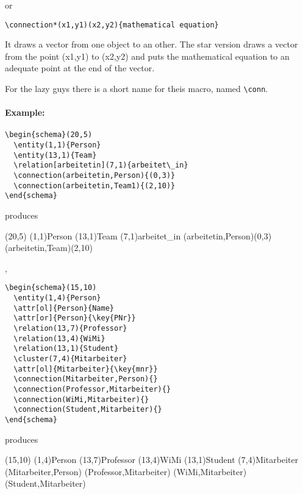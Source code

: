 \documentclass[a4paper,11pt]{article}
\begin{document}
or

\begin{verbatim}
\connection*(x1,y1)(x2,y2){mathematical equation}
\end{verbatim}

It draws a vector from one object to an other. The star version draws 
a vector from the point (x1,y1) to (x2,y2) and puts the mathematical 
equation to an adequate point at the end of the vector.

For the lazy guys there is a short name for theis macro, named \verb|\conn|. 

\paragraph{Example:}

\begin{verbatim}
\begin{schema}(20,5)
  \entity(1,1){Person}
  \entity(13,1){Team}
  \relation[arbeitetin](7,1){arbeitet\_in}
  \connection(arbeitetin,Person){(0,3)}
  \connection(arbeitetin,Team1){(2,10)}
\end{schema}
\end{verbatim}

produces

\begin{schema}(20,5)
  \entity(1,1){Person}
  \entity(13,1){Team}
  \relation[arbeitetin](7,1){arbeitet\_in}
  \connection(arbeitetin,Person){(0,3)}
  \connection(arbeitetin,Team){(2,10)}
\end{schema}

, 

\begin{verbatim}
\begin{schema}(15,10)
  \entity(1,4){Person}
  \attr[ol]{Person}{Name}
  \attr[or]{Person}{\key{PNr}}
  \relation(13,7){Professor}
  \relation(13,4){WiMi}
  \relation(13,1){Student}
  \cluster(7,4){Mitarbeiter}
  \attr[ol]{Mitarbeiter}{\key{mnr}}
  \connection(Mitarbeiter,Person){}
  \connection(Professor,Mitarbeiter){}
  \connection(WiMi,Mitarbeiter){}
  \connection(Student,Mitarbeiter){}
\end{schema}
\end{verbatim}

produces

\begin{schema}(15,10)
  \entity(1,4){Person}
  \relation(13,7){Professor}
  \relation(13,4){WiMi}
  \relation(13,1){Student}
  \cluster(7,4){Mitarbeiter}
  \connection(Mitarbeiter,Person){}
  \connection(Professor,Mitarbeiter){}
  \connection(WiMi,Mitarbeiter){}
  \connection(Student,Mitarbeiter){}
\end{schema}
\end{document}
